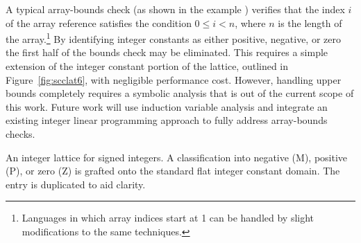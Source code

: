 \documentclass[12pt,titlepage,twoside]{article}
\newcommand{\figscale}{1.0}
\begin{document}
A typical array-bounds check (as shown in the example )
verifies that the index $i$ of the array reference satisfies the
condition $0\leq i < n$, where $n$ is the length of the
array.\footnote{Languages in which array indices start at 1 can be
handled by slight modifications to the same techniques.} By
identifying integer constants as either positive, negative, or zero
the first half of the bounds check may be eliminated.  This requires a
simple extension of the integer constant portion of the lattice,
outlined in Figure~\vref{fig:scclat6}, with
negligible performance cost.  However, handling upper bounds
completely requires a symbolic analysis that is out of the current
scope of this work.  Future work will use induction variable analysis
and integrate an existing integer linear programming approach
\cite{rugina99:divide} to fully address array-bounds checks.
\begin{myfigure}[t]
\centering\renewcommand{\figscale}{0.6}
\caption[An integer lattice for signed integers.]
{An integer lattice for signed integers. A classification into
negative (M), positive (P), or zero (Z) is grafted onto the standard
flat integer constant domain.  The  entry is duplicated to
aid clarity.}
\label{fig:scclat6}
\end{myfigure}
\end{document}
